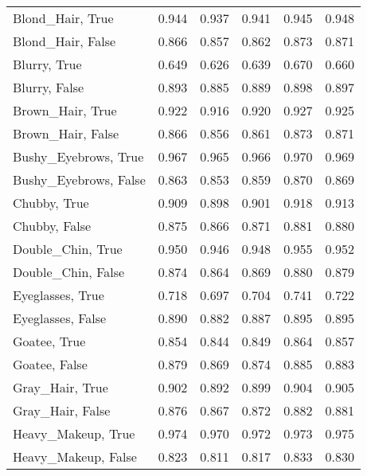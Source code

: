 \begin{tabular}{lrrrrr}
          Blond\_Hair, True &   0.944 &        0.937 &         0.941 &     0.945 &     0.948 \\
         Blond\_Hair, False &   0.866 &        0.857 &         0.862 &     0.873 &     0.871 \\
              Blurry, True &   0.649 &        0.626 &         0.639 &     0.670 &     0.660 \\
             Blurry, False &   0.893 &        0.885 &         0.889 &     0.898 &     0.897 \\
          Brown\_Hair, True &   0.922 &        0.916 &         0.920 &     0.927 &     0.925 \\
         Brown\_Hair, False &   0.866 &        0.856 &         0.861 &     0.873 &     0.871 \\
      Bushy\_Eyebrows, True &   0.967 &        0.965 &         0.966 &     0.970 &     0.969 \\
     Bushy\_Eyebrows, False &   0.863 &        0.853 &         0.859 &     0.870 &     0.869 \\
              Chubby, True &   0.909 &        0.898 &         0.901 &     0.918 &     0.913 \\
             Chubby, False &   0.875 &        0.866 &         0.871 &     0.881 &     0.880 \\
         Double\_Chin, True &   0.950 &        0.946 &         0.948 &     0.955 &     0.952 \\
        Double\_Chin, False &   0.874 &        0.864 &         0.869 &     0.880 &     0.879 \\
          Eyeglasses, True &   0.718 &        0.697 &         0.704 &     0.741 &     0.722 \\
         Eyeglasses, False &   0.890 &        0.882 &         0.887 &     0.895 &     0.895 \\
              Goatee, True &   0.854 &        0.844 &         0.849 &     0.864 &     0.857 \\
             Goatee, False &   0.879 &        0.869 &         0.874 &     0.885 &     0.883 \\
           Gray\_Hair, True &   0.902 &        0.892 &         0.899 &     0.904 &     0.905 \\
          Gray\_Hair, False &   0.876 &        0.867 &         0.872 &     0.882 &     0.881 \\
        Heavy\_Makeup, True &   0.974 &        0.970 &         0.972 &     0.973 &     0.975 \\
       Heavy\_Makeup, False &   0.823 &        0.811 &         0.817 &     0.833 &     0.830 \\

\end{tabular}
